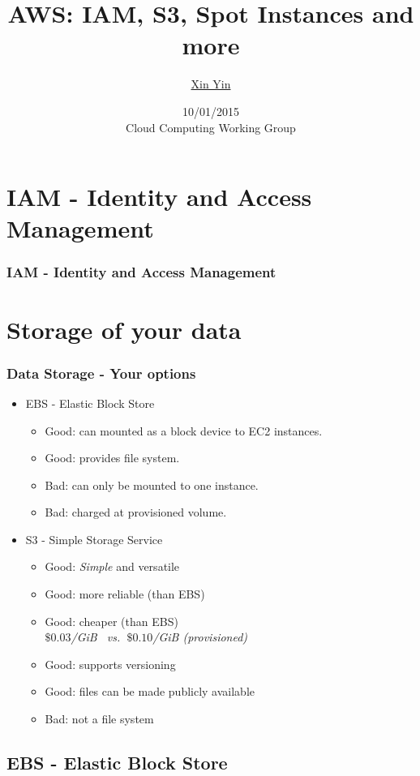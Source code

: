 \documentclass[10pt]{beamer}
\title{AWS: IAM, S3, Spot Instances and more}
\author{\underline{Xin Yin}}
\date{\scriptsize 10/01/2015\\
Cloud Computing Working Group}
\begin{document}
\frame{\titlepage}

\section{IAM - Identity and Access Management}
\begin{frame}
    \frametitle{IAM - Identity and Access Management}
\end{frame}

\section{Storage of your data}
\begin{frame}
    \frametitle{Data Storage - Your options}
    \begin{itemize}
        \item EBS - Elastic Block Store 
            \begin{itemize}
                \item {\color{green} Good:} can mounted as a block device to EC2 instances.
                \item {\color{green} Good:} provides file system.
                \item {\color{red} Bad:} can only be mounted to one instance.
                \item {\color{red} Bad:} charged at provisioned volume.
            \end{itemize}
        \item S3 - Simple Storage Service 
            \begin{itemize}
                \item {\color{green} Good:} {\it Simple} and versatile
                \item {\color{green} Good:} more reliable (than EBS)
                \item {\color{green} Good:} cheaper (than EBS)\\ {\it $\$ 0.03$/GiB~ vs. $~\$ 0.10$/GiB (provisioned)}
                \item {\color{green} Good:} supports versioning
                \item {\color{green} Good:} files can be made publicly available 
                \item {\color{red} Bad:} not a file system 
            \end{itemize}
    \end{itemize}
\end{frame}
\subsection{EBS - Elastic Block Store}
\end{document}
